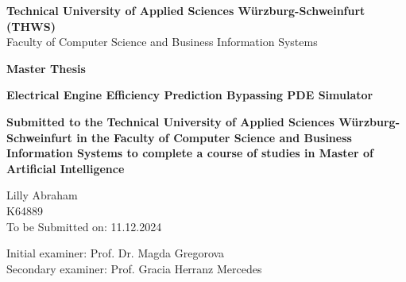 \documentclass{report} %
\begin{document}
\begin{titlepage}
    \centering
    \vspace*{1cm}
    
    \Large \textbf{Technical University of Applied Sciences Würzburg-Schweinfurt (THWS)}\\
    \vspace{0.5cm}
    \Large Faculty of Computer Science and Business Information Systems\\
    \vspace{1cm}
    
    \huge \textbf{Master Thesis}\\
    \vspace{1.5cm}
    
    \Huge \textbf{Electrical Engine Efficiency Prediction  Bypassing PDE Simulator}\\
    \vspace{2cm}
    
    \large \textbf{Submitted to the Technical University of Applied Sciences Würzburg-Schweinfurt in the Faculty of Computer Science and Business Information Systems to
    complete a course of studies in Master of Artificial Intelligence}
    
    \vspace{1cm}
    
    \huge Lilly Abraham\\
    \huge K64889\\
    \vspace{1cm}
    \large To be Submitted on: 11.12.2024\\ %
    
    \vfill
    
    \large
    Initial examiner: Prof. Dr. Magda Gregorova\\
    Secondary examiner: Prof. Gracia Herranz Mercedes\\

\end{titlepage}

\newpage %
\end{document}
